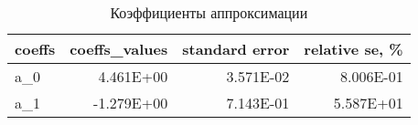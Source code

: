 \begin{table}[H]
\centering
\caption{Коэффициенты аппроксимации}
\label{coeffs_table}
\begin{tabular}{lrrr}
\toprule
coeffs &  coeffs\_values &  standard error &  relative se, \% \\
\midrule
   a\_0 &      4.461E+00 &       3.571E-02 &       8.006E-01 \\
   a\_1 &     -1.279E+00 &       7.143E-01 &       5.587E+01 \\
\bottomrule
\end{tabular}
\end{table}
